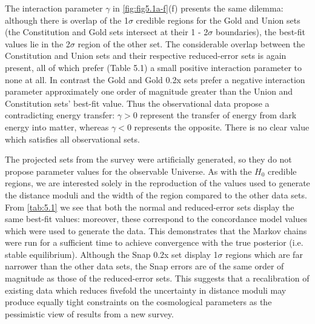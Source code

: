 The interaction parameter $\gamma$ in \cref{fig:fig5.1a-f}(f) presents the same dilemma: although there is overlap of the 1$\sigma$ credible regions for the Gold and Union sets (the Constitution and Gold sets intersect at their 1 - 2$\sigma$ boundaries), the best-fit values lie in the 2$\sigma$ region of the other set. The considerable overlap between the Constitution and Union sets and their respective reduced-error sets is again present, all of which prefer (Table 5.1) a small positive interaction parameter to none at all. In contrast the Gold and Gold 0.2x sets prefer a negative interaction parameter approximately one order of magnitude greater than the Union and Constitution sets’ best-fit value. Thus the observational data propose a contradicting energy transfer: $\gamma > 0$ represent the transfer of energy from dark energy into matter, whereas $\gamma < 0$ represents the opposite. There is no clear value which satisfies all observational sets.

The projected sets from the \snap{} survey were artificially generated, so they do not propose parameter values for the observable Universe. As with the $H_0$ credible regions, we are interested solely in the reproduction of the values used to generate the distance moduli and the width of the region compared to the other data sets. From \cref{tab:5.1} we see that both the normal and reduced-error sets display the same best-fit values: moreover, these correspond to the concordance model values which were used to generate the data. This demonstrates that the Markov chains were run for a sufficient time to achieve convergence with the true posterior (i.e. stable equilibrium). Although the Snap 0.2x set display 1$\sigma$ regions which are far narrower than the other data sets, the Snap errors are of the same order of magnitude as those of the reduced-error sets. This suggests that a recalibration of existing data which reduces fivefold the uncertainty in distance moduli may produce equally tight constraints on the cosmological parameters as the pessimistic view of results from a new survey.

